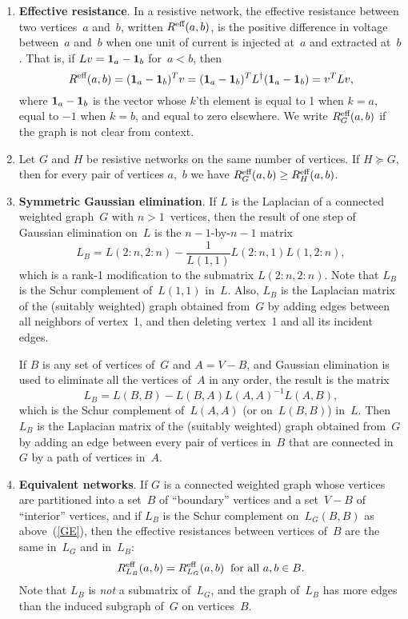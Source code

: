 \documentclass[11pt]{article}
\newcommand{\m}[1]{{\bf{#1}}}       %
\newcommand{\ones}{\m1}             %
\newcommand{\Reff}{R^{\mbox{\scriptsize eff}}}  %
\newcommand{\pinv}{^{\dagger}}                  %
\begin{document}
\begin{enumerate}
\item{\bf Effective resistance}.
In a resistive network, the effective resistance between
two vertices~$a$ and~$b$, written $\Reff(a,b)$, 
is the positive difference in voltage
between~$a$ and~$b$ when one unit of current is injected at~$a$
and extracted at~$b$.
That is, if $Lv=\ones_a-\ones_b$ for~$a<b$, then
$$\Reff(a,b) = (\ones_a-\ones_b)^Tv 
  = (\ones_a-\ones_b)^TL\pinv (\ones_a-\ones_b) = v^TLv,$$
where $\ones_a-\ones_b$
is the vector whose $k$'th element is equal to 1 when $k=a$, 
equal to $-1$ when $k=b$, and equal to zero elsewhere.
We write $\Reff_G(a,b)$ if the graph is not clear from context.

\item
Let $G$ and $H$ be resistive networks on the same number of vertices.
If $H\succeq G$, then for every pair of vertices $a$,~$b$ we have
$\Reff_G(a,b) \geq \Reff_H(a,b)$.

\item\label{GE}{\bf Symmetric Gaussian elimination}.
If $L$ is the Laplacian of a connected weighted graph~$G$ 
with $n>1$~vertices,
then the result of one step of Gaussian elimination on~$L$ is the
$n-1$-by-$n-1$ matrix
$$L_B = L(2:n, 2:n) - \frac{1}{L(1,1)}L(2:n,1)L(1,2:n),$$
which is a rank-1 modification to the submatrix $L(2:n, 2:n)$.
Note that $L_B$ is the Schur complement of~$L(1,1)$ in~$L$.
Also, $L_B$ is the Laplacian matrix of the (suitably weighted) 
graph obtained from~$G$
by adding edges between all neighbors of vertex~1,
and then deleting vertex~1 and all its incident edges.

If $B$ is any set of vertices of~$G$ and $A=V-B$, 
and Gaussian elimination is used to eliminate all the 
vertices of~$A$ in any order, the result is the matrix
$$L_B = L(B,B) - L(B,A)L(A,A)^{-1}L(A,B),$$
which is the Schur complement of~$L(A,A)$ (or on~$L(B,B)$) in~$L$.
Then $L_B$ is the Laplacian matrix of the (suitably weighted)
graph obtained from~$G$ by adding an edge between every pair 
of vertices in~$B$ that are connected in~$G$ by a path of 
vertices in~$A$.

\item{\bf Equivalent networks}.
If $G$ is a connected weighted graph whose vertices are
partitioned into a set~$B$ of ``boundary'' vertices and
a set~$V-B$ of ``interior'' vertices, 
and if $L_B$ is the Schur complement on~$L_G(B,B)$ 
as above~(\ref{GE}),
then the effective resistances between vertices of~$B$
are the same in~$L_G$ and in~$L_B$:
$$\Reff_{L_B}(a,b) = \Reff_{L_G}(a,b)\;\;\mbox{for all $a,b\in B$}.$$
Note that $L_B$ is {\em not} a submatrix of~$L_G$, 
and the graph of~$L_B$ has more edges than the induced 
subgraph of~$G$ on vertices~$B$.


\end{enumerate}
\end{document}
